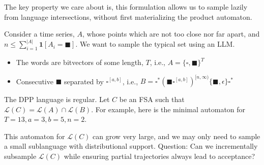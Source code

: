 \documentclass[portrait,a0b,final,a4resizeable]{a0poster}
\def\jointspacing{\vspace{0.3in}}
\newcommand{\bs}{\blacksquare}
\newcommand{\ws}{\square}
\begin{document}
\begin{poster}
\begin{multicols}{2}
    \hspace*{2cm}\begin{minipage}[c]{0.90\columnwidth}
    The key property we care about is, this formulation allows us to sample lazily from language intersections, without first materializing the product automaton.
    \end{minipage}

    \jointspacing


      \jointspacing

      \hspace*{2cm}\begin{minipage}[c]{0.90\columnwidth}
      Consider a time series, $A$, whose points which are not too close nor far apart, and $n \leq \sum_{i=1}^{|A|} \mathbf{1}[A_i = \bs]$. We want to sample the typical set using an LLM.\vspace{0.5cm}
\begin{itemize}[leftmargin=2cm]
\item The words are bitvectors of some length, $T$, i.e., $A = \{\ws, \bs\}^T$
\item Consecutive $\bs$ separated by $\ws^{[a,b]}$, i.e., $B = \ws^*(\bs\ws^{[a, b]})^{[n,\infty)}\{\bs,\epsilon\}\ws^*$
\end{itemize}\vspace{0.5cm}

The DPP language is regular. Let $C$ be an FSA such that $\mathcal{L}(C) = \mathcal{L}(A) \cap \mathcal{L}(B)$. For example, here is the minimal automaton for $T=13, a=3, b=5, n=2$.
      \end{minipage}

\jointspacing

\hspace{5cm}

\jointspacing

      \hspace*{2cm}\begin{minipage}[c]{0.90\columnwidth}
This automaton for $\mathcal{L}(C)$ can grow very large, and we may only need to sample a small sublanguage with distributional support.
Question: Can we incrementally subsample $\mathcal{L}(C)$ while ensuring partial trajectories always lead to acceptance?
\vspace{2cm}
      \end{minipage}


\end{multicols}
\end{poster}
\end{document}
